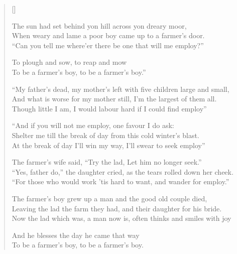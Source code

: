 \pagebreak
\settowidth{\versewidth}{And what is worse for my mother still, I'm the largest of them all.}

\begin{verse}[\versewidth]

The sun had set behind yon hill across yon dreary moor,\\
When weary and lame a poor boy came up to a farmer's door.\\
``Can you tell me where'er there be one that will me employ?''\\
\begin{chorus}To plough and sow, to reap and mow\\
To be a farmer's boy, to be a farmer's boy.''
\end{chorus}

``My father's dead, my mother's left with five children large and small,\\
And what is worse for my mother still, I'm the largest of them all.\\
Though little I am, I would labour hard if I could find employ''


``And if you will not me employ, one favour I do ask:\\
Shelter me till the break of day from this cold winter's blast.\\
At the break of day I'll win my way, I'll swear to seek employ''


The farmer's wife said, ``Try the lad, Let him no longer seek.''\\
``Yes, father do,'' the daughter cried, as the tears rolled down her cheek.\\
``For those who would work 'tis hard to want, and wander for employ.''


The farmer's boy grew up a man and the good old couple died,\\
Leaving the lad the farm they had, and their daughter for his bride.\\
Now the lad which was, a man now is, often thinks and smiles with joy\\
\begin{chorus}And he blesses the day he came that way\\
To be a farmer's boy, to be a farmer's boy.\end{chorus}

\end{verse}
